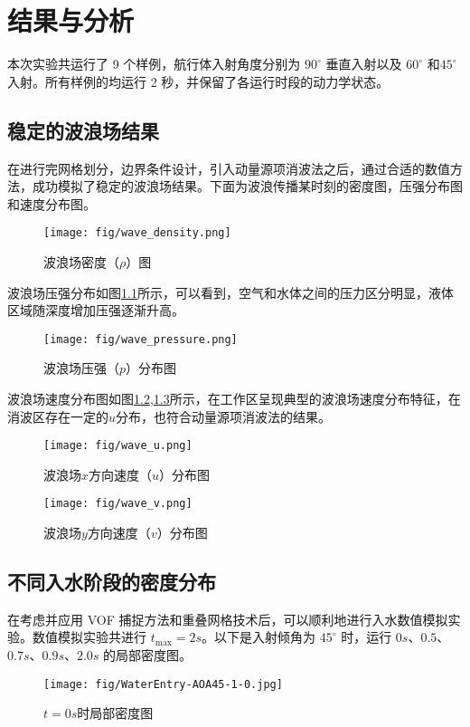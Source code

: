 \chapter{结果与分析}
本次实验共运行了 9 个样例，航行体入射角度分别为 $90 ^\circ$ 垂直入射以及 $60 ^\circ$ 和$45 ^\circ$入射。所有样例的均运行 2 秒，并保留了各运行时段的动力学状态。

\section{稳定的波浪场结果}
在进行完网格划分，边界条件设计，引入动量源项消波法之后，通过合适的数值方法，成功模拟了稳定的波浪场结果。下面为波浪传播某时刻的密度图，压强分布图和速度分布图。

\begin{figure}[!htp]
  \centering
  \texttt{[image: fig/wave\_density.png]}
  \caption{波浪场密度（$\rho$）图}
\end{figure}

波浪场压强分布如图\ref{fig:wave_pressure}所示，可以看到，空气和水体之间的压力区分明显，液体区域随深度增加压强逐渐升高。
\begin{figure}[!htp]
  \centering
  \texttt{[image: fig/wave\_pressure.png]}
  \caption{波浪场压强（$p$）分布图}
  \label{fig:wave_pressure}
\end{figure}

波浪场速度分布图如图\ref{fig:wave_u},\ref{fig:wave_v}所示，在工作区呈现典型的波浪场速度分布特征，在消波区存在一定的$u$分布，也符合动量源项消波法的结果。
\begin{figure}[!htp]
  \centering
  \texttt{[image: fig/wave\_u.png]}
  \caption{波浪场$x$方向速度（$u$）分布图}
  \label{fig:wave_u}
\end{figure}
\begin{figure}[!htp]
  \centering
  \texttt{[image: fig/wave\_v.png]}
  \caption{波浪场$y$方向速度（$v$）分布图}
  \label{fig:wave_v}
\end{figure}

\section{不同入水阶段的密度分布}
在考虑并应用 VOF 捕捉方法和重叠网格技术后，可以顺利地进行入水数值模拟实验。数值模拟实验共进行 $t_{\max} = 2s$。以下是入射倾角为 $45^\circ$ 时，运行 $0s$、$0.5$、$0.7s$、$0.9s$、$2.0s$ 的局部密度图。

\begin{figure}[!htp]
  \centering
  \texttt{[image: fig/WaterEntry-AOA45-1-0.jpg]}
  \caption{$t=0s$时局部密度图} 
\end{figure}


